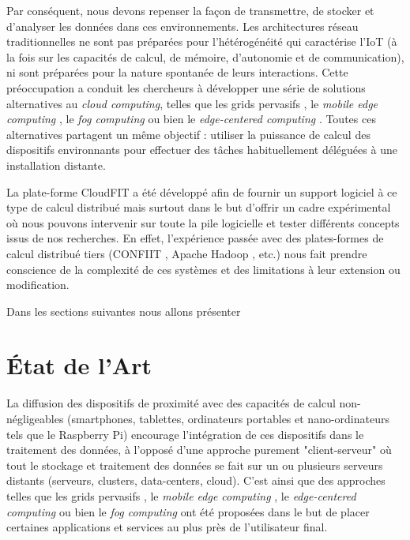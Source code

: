 Par conséquent, nous devons repenser la façon de transmettre, de stocker et d'analyser les données dans ces environnements. Les architectures réseau traditionnelles ne sont pas préparées pour l'hétérogénéité qui caractérise l'IoT (à la fois sur les capacités de calcul, de mémoire, d'autonomie et de communication), ni sont préparées pour la nature spontanée de leurs interactions. Cette préoccupation a conduit les chercheurs à développer une série de solutions alternatives au \textit{cloud computing}, telles que les grids pervasifs \cite{Parashar2010}, le \textit{mobile edge computing} \cite {Dey2013,MEC,Satyanarayanan09}, le \textit{fog computing} \cite{Bonomi2012} ou bien le \textit{edge-centered computing} \cite{Lopez2015}. Toutes ces alternatives partagent un même objectif : utiliser la puissance de calcul des dispositifs environnants pour effectuer des tâches habituellement déléguées à une installation distante. 

La plate-forme CloudFIT a été développé afin de fournir un support logiciel à ce type de calcul distribué mais surtout dans le but d'offrir un cadre expérimental où nous pouvons intervenir sur toute la pile logicielle et tester différents concepts issus de nos recherches. En effet, l'expérience passée avec des plates-formes de calcul distribué tiers (CONFIIT \cite{Flauzac10}, Apache Hadoop \cite{Hadoop,Steffenel13b}, etc.) nous fait prendre conscience de la complexité de ces systèmes et des limitations à leur  extension ou modification. 
  
Dans les sections suivantes nous allons présenter %

\section{État de l'Art}

La diffusion des dispositifs de proximité avec des capacités de calcul non-négligeables (smartphones, tablettes, ordinateurs portables et nano-ordinateurs tels que le Raspberry Pi) encourage l'intégration de ces dispositifs dans le traitement des données, à l'opposé d'une approche purement "client-serveur" où tout le stockage et traitement des données se fait sur un ou plusieurs serveurs distants (serveurs, clusters, data-centers, cloud). C'est ainsi que des approches telles que les grids pervasifs \cite{Parashar2010}, le \textit{mobile edge computing} \cite {Dey2013,MEC,Satyanarayanan09}, le \textit{edge-centered computing} \cite{Lopez2015} ou bien le \textit{fog computing} \cite{Bonomi2012} ont été proposées dans le but de placer certaines applications et services au plus près de l'utilisateur final.

